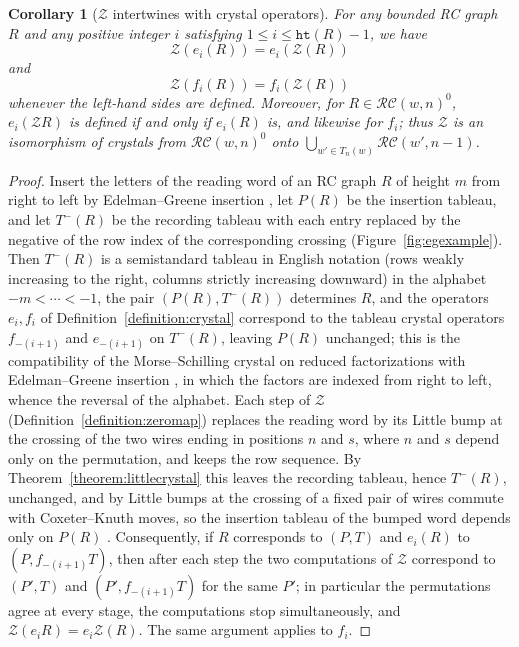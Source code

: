 \documentclass{amsart}
\newtheorem{corollary}[lemma]{Corollary}
\theoremstyle{definition}
\theoremstyle{remark}
\numberwithin{equation}{subsection}
\newcommand{\zeromap}{\mathcal{Z}}
\newcommand{\hr}{\mathtt{ht}}
\newcommand{\RC}{\mathcal{RC}}
\begin{document}
\begin{corollary}[$\zeromap$ intertwines with crystal operators] \label{corollary:crystaliso}
For any bounded RC graph $R$ and any positive integer $i$ satisfying $1\leq i\leq \hr(R) - 1$, we have 
$$\zeromap(e_i(R)) = e_i(\zeromap(R))$$
and
$$\zeromap(f_i(R)) = f_i(\zeromap(R))$$
whenever the left-hand sides are defined. Moreover, for $R\in\RC(w,n)^0$, $e_i(\zeromap R)$ is defined if and only if $e_i(R)$ is, and likewise for $f_i$; thus $\zeromap$ is an isomorphism of crystals from $\RC(w,n)^0$ onto $\bigcup_{w'\in T_n(w)}\RC(w',n-1)$.
\end{corollary}
\begin{proof}
Insert the letters of the reading word of an RC graph $R$ of height $m$ from right to left by Edelman--Greene insertion \cite{edelman1987balanced}, let $P(R)$ be the insertion tableau, and let $T^-(R)$ be the recording tableau with each entry replaced by the negative of the row index of the corresponding crossing (Figure~\ref{fig:egexample}). Then $T^-(R)$ is a semistandard tableau in English notation (rows weakly increasing to the right, columns strictly increasing downward) in the alphabet $-m<\cdots<-1$, the pair $(P(R),T^-(R))$ determines $R$, and the operators $e_i,f_i$ of Definition~\ref{definition:crystal} correspond to the tableau crystal operators $f_{-(i+1)}$ and $e_{-(i+1)}$ on $T^-(R)$, leaving $P(R)$ unchanged; this is the compatibility of the Morse--Schilling crystal on reduced factorizations with Edelman--Greene insertion \cite{morse2016crystal}, in which the factors are indexed from right to left, whence the reversal of the alphabet. Each step of $\zeromap$ (Definition~\ref{definition:zeromap}) replaces the reading word by its Little bump at the crossing of the two wires ending in positions $n$ and $s$, where $n$ and $s$ depend only on the permutation, and keeps the row sequence. By Theorem~\ref{theorem:littlecrystal} this leaves the recording tableau, hence $T^-(R)$, unchanged, and by \cite[Lemma~3.3]{hamaker2014relating} Little bumps at the crossing of a fixed pair of wires commute with Coxeter--Knuth moves, so the insertion tableau of the bumped word depends only on $P(R)$ \cite[Theorem~6.24]{edelman1987balanced}. Consequently, if $R$ corresponds to $(P,T)$ and $e_i(R)$ to $(P,f_{-(i+1)}T)$, then after each step the two computations of $\zeromap$ correspond to $(P',T)$ and $(P',f_{-(i+1)}T)$ for the same $P'$; in particular the permutations agree at every stage, the computations stop simultaneously, and $\zeromap(e_iR)=e_i\zeromap(R)$. The same argument applies to $f_i$.


\end{proof}
\end{document}
